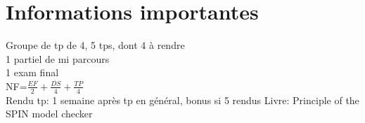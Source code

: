 \section{Informations importantes}
Groupe de tp de 4, 5 tps, dont 4 à rendre\\
1 partiel de mi parcours\\
1 exam final\\
NF=$\frac{EF}{2}+\frac{DS}{4}+\frac{TP}{4}$\\
Rendu tp: 1 semaine après tp en général, bonus si 5 
rendus
Livre: Principle of the SPIN model checker
